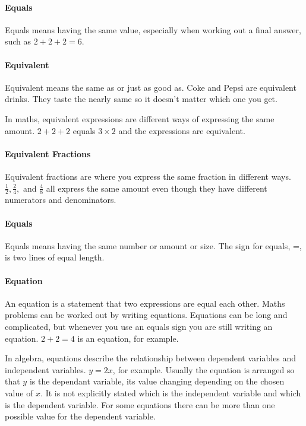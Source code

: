\documentclass[12pt]{article}
\begin{document}
\paragraph{Equals}
Equals means having the same value, especially when working out a final answer, such as  $2+2+2=6.$

\paragraph{Equivalent}
Equivalent means the same as or just as good as. Coke and Pepsi are equivalent drinks. They taste the nearly same so it doesn’t matter which one you get.

In maths, equivalent expressions are different ways of expressing the same amount. $2+2+2$ equals $3\times2$ and the expressions are equivalent.

\paragraph{Equivalent Fractions}
Equivalent fractions are where you express the same fraction in different ways. $\frac{1}{2}, \frac{2}{4},$ and $\frac{4}{8}$ all express the same amount even though they have different numerators and denominators.

\paragraph{Equals}
Equals means having the same number or amount or size.
The sign for equals, =, is two lines of equal length.

\paragraph{Equation}
An equation is a statement that two expressions are equal each other. Maths problems can be worked out by writing equations. Equations can be long and complicated, but whenever you use an equals sign you are still writing an equation. $2+2=4$ is an equation, for example.

In algebra, equations describe the relationship between dependent variables and independent variables. $y=2x$, for example. Usually the equation is arranged so that $y$ is the dependant variable, its value changing depending on the chosen value of $x$. It is not explicitly stated which is the independent variable and which is the dependent variable. For some equations there can be more than one possible value for the dependent variable.
\end{document}

